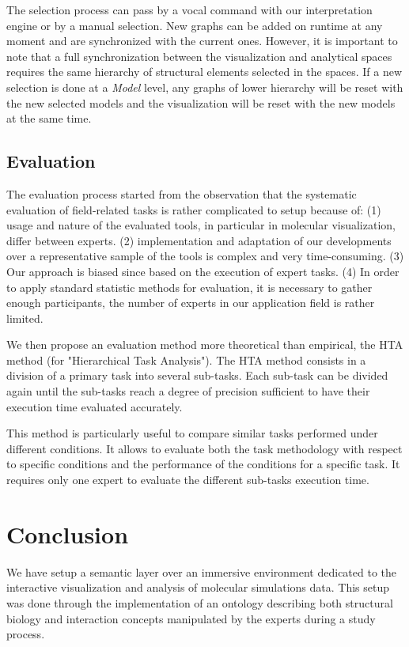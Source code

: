\documentclass{vgtc}                          %
\begin{document}
The selection process can pass by a vocal command with our interpretation engine or by a manual selection. 
New graphs can be added on runtime at any moment and are synchronized with the current ones. However, it is important to note that a full synchronization between the visualization and analytical spaces requires the same hierarchy of structural elements selected in the spaces. If a new selection is done at a \textit{Model} level, any graphs of lower hierarchy will be reset with the new selected models and the visualization will be reset with the new models at the same time.

\subsection{Evaluation}

The evaluation process started from the observation that the systematic evaluation of field-related tasks is rather complicated to setup because of: (1) usage and nature of the evaluated tools, in particular in molecular visualization, differ between experts. (2) implementation and adaptation of our developments over a representative sample of the tools is complex and very time-consuming. (3) Our approach is biased since based on the execution of expert tasks. (4) In order to apply standard statistic methods for evaluation, it is necessary to gather enough participants, the number of experts in our application field is rather limited.

We then propose an evaluation method more theoretical than empirical, the HTA method (for "Hierarchical Task Analysis"). The HTA method consists in a division of a primary task into several sub-tasks. Each sub-task can be divided again until the sub-tasks reach a degree of precision sufficient to have their execution time evaluated accurately.

This method is particularly useful to compare similar tasks performed under different conditions. It allows to evaluate both the task methodology with respect to specific conditions and the performance of the conditions for a specific task. It requires only one expert to evaluate the different sub-tasks execution time.

\section{Conclusion}

We have setup a semantic layer over an immersive environment dedicated to the interactive visualization and analysis of molecular simulations data. This setup was done through the implementation of an ontology describing both structural biology and interaction concepts manipulated by the experts during a study process.
\end{document}
